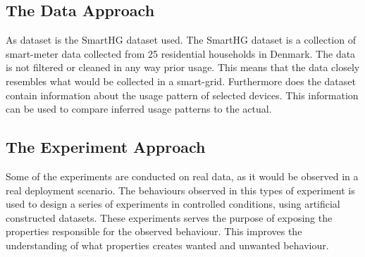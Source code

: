 \subsection{The Data Approach}
As dataset is the SmartHG dataset used. The SmartHG dataset is a collection of smart-meter data collected from 25 residential households in Denmark. The data is not filtered or cleaned in any way prior usage. This means that the data closely resembles what would be collected in a smart-grid. Furthermore does the dataset contain information about the usage pattern of selected devices. This information can be used to compare inferred usage patterns to the actual. 

\subsection{The Experiment Approach}
Some of the experiments are conducted on real data, as it would be observed in a real deployment scenario. The behaviours observed in this types of experiment is used to design a series of experiments in controlled conditions, using artificial constructed datasets. These experiments serves the purpose of exposing the properties responsible for the observed behaviour. This improves the understanding of what properties creates wanted and unwanted behaviour. 